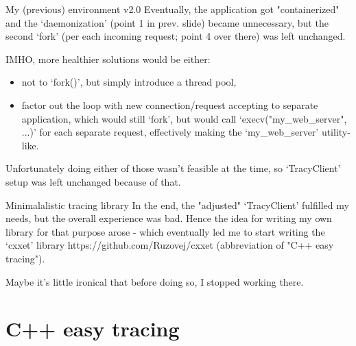 \documentclass[aspectratio=169]{beamer}
\begin{document}
\begin{frame}{My (previous) environment v2.0}
    Eventually, the application got "containerized" and the `daemonization' (point 1 in prev. slide) became unnecessary, but the second `fork' (per each incoming request; point 4 over there) was left unchanged.

    IMHO, more healthier solutions would be either:

    \begin{itemize}
        \item not to `fork()', but simply introduce a thread pool,
        \item factor out the loop with new connection/request accepting to separate application, which would still `fork', but would call `execv("my\_web\_server", ...)' for each separate request, effectively making the `my\_web\_server' utility-like.
    \end{itemize}

    Unfortunately doing either of those wasn't feasible at the time, so `TracyClient' setup was left unchanged because of that.

\end{frame}

\begin{frame}{Minimalalistic tracing library}
    In the end, the "adjusted" `TracyClient' fulfilled my needs, but the overall experience was bad. Hence the idea for writing my own library for that purpose arose - which eventually led me to start writing the `cxxet' library https://github.com/Ruzovej/cxxet (abbreviation of "C++ easy tracing").
    
    Maybe it's little ironical that before doing so, I stopped working there.

\end{frame}



\section{C++ easy tracing}
\end{document}
